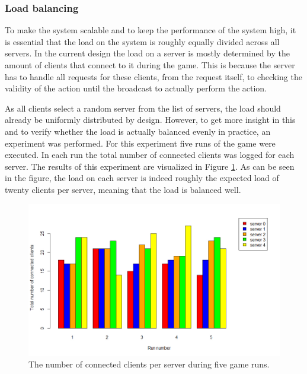 \subsubsection{Load balancing}
\label{subsubsec:exp_load}
To make the system scalable and to keep the performance of the system high, it is essential that the load on the system is roughly equally divided across all servers.
In the current design the load on a server is mostly determined by the amount of clients that connect to it during the game. 
This is because the server has to handle all requests for these clients, from the request itself, to checking the validity of the action until the broadcast to actually perform the action.

As all clients select a random server from the list of servers, the load should already be uniformly distributed by design.
However, to get more insight in this and to verify whether the load is actually balanced evenly in practice, an experiment was performed. 
For this experiment five runs of the game were executed. In each run the total number of connected clients was logged for each server. 
The results of this experiment are visualized in Figure \ref{fig:connected_players_plot}. 
As can be seen in the figure, the load on each server is indeed roughly the expected load of twenty clients per server, meaning that the load is balanced well.

\begin{figure}[h!]
  \centering
    \includegraphics[width=\textwidth]{images/connected_players_plot}
    
  \caption{The number of connected clients per server during five game runs.}
  \label{fig:connected_players_plot}
\end{figure}
